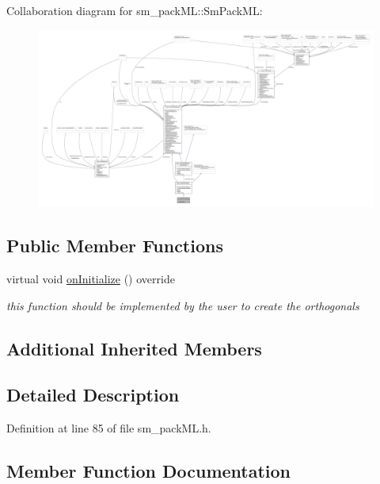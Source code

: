 Collaboration diagram for sm\+\_\+pack\+ML\+:\+:Sm\+Pack\+ML\+:
\nopagebreak
\begin{figure}[H]
\begin{center}
\leavevmode
\includegraphics[width=350pt]{structsm__packML_1_1SmPackML__coll__graph}
\end{center}
\end{figure}
\subsection*{Public Member Functions}
\begin{DoxyCompactItemize}
\item 
virtual void \hyperlink{structsm__packML_1_1SmPackML_a63aa0e31bcdf6c9584011d14bc6ec8af}{on\+Initialize} () override
\begin{DoxyCompactList}\small\item\em this function should be implemented by the user to create the orthogonals \end{DoxyCompactList}\end{DoxyCompactItemize}
\subsection*{Additional Inherited Members}


\subsection{Detailed Description}


Definition at line 85 of file sm\+\_\+pack\+M\+L.\+h.



\subsection{Member Function Documentation}
